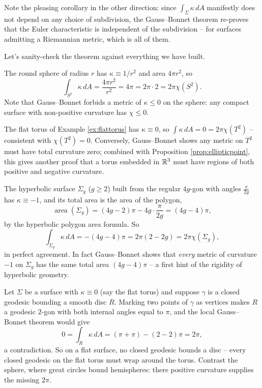 \documentclass[a4paper]{scrartcl}
\begin{document}
\begin{remark}
    Note the pleasing corollary in the other direction: since $\int_\Sigma \kappa \, dA$ manifestly does not depend on any choice of subdivision, the Gauss--Bonnet theorem re-proves that the Euler characteristic is independent of the subdivision -- for surfaces admitting a Riemannian metric, which is all of them.
\end{remark}

Let's sanity-check the theorem against everything we have built.

\begin{example}
    The round sphere of radius $r$ has $\kappa \equiv 1/r^2$ and area $4\pi r^2$, so
    $$
    \int_{S^2} \kappa \, dA = \frac{4 \pi r^2}{r^2} = 4\pi = 2\pi \cdot 2 = 2\pi \chi(S^2).
    $$
    Note that Gauss--Bonnet forbids a metric of $\kappa \leq 0$ on the sphere: any compact surface with non-positive curvature has $\chi \leq 0$.
\end{example}

\begin{example}
    The flat torus of Example \ref{ex:flattorus} has $\kappa \equiv 0$, so $\int \kappa \, dA = 0 = 2\pi\chi(T^2)$ -- consistent with $\chi(T^2) = 0$. Conversely, Gauss--Bonnet shows any metric on $T^2$ must have total curvature zero; combined with Proposition \ref{prop:ellipticpoint}, this gives another proof that a torus embedded in $\mathbb{R}^3$ must have regions of both positive and negative curvature.
\end{example}

\begin{example}
    The hyperbolic surface $\Sigma_g$ ($g \geq 2$) built from the regular $4g$-gon with angles $\frac{\pi}{2g}$ has $\kappa \equiv -1$, and its total area is the area of the polygon,
    $$
    \operatorname{area}(\Sigma_g) = (4g - 2)\pi - 4g \cdot \frac{\pi}{2g} = (4g - 4)\pi,
    $$
    by the hyperbolic polygon area formula. So
    $$
    \int_{\Sigma_g} \kappa \, dA = -(4g - 4)\pi = 2\pi(2 - 2g) = 2\pi \chi(\Sigma_g),
    $$
    in perfect agreement. In fact Gauss--Bonnet shows that \emph{every} metric of curvature $-1$ on $\Sigma_g$ has the same total area $(4g - 4)\pi$ -- a first hint of the rigidity of hyperbolic geometry.
\end{example}

\begin{example}
    Let $\Sigma$ be a surface with $\kappa \equiv 0$ (say the flat torus) and suppose $\gamma$ is a closed geodesic bounding a smooth disc $R$. Marking two points of $\gamma$ as vertices makes $R$ a geodesic $2$-gon with both internal angles equal to $\pi$, and the local Gauss--Bonnet theorem would give
    $$
    0 = \int_R \kappa \, dA = (\pi + \pi) - (2 - 2)\pi = 2\pi,
    $$
    a contradiction. So on a flat surface, no closed geodesic bounds a disc -- every closed geodesic on the flat torus must wrap around the torus. Contrast the sphere, where great circles bound hemispheres: there positive curvature supplies the missing $2\pi$.
\end{example}
\end{document}
